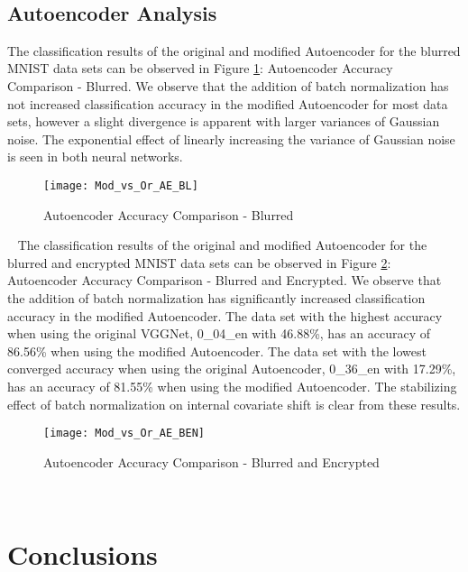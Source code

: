 \documentclass[12pt, titlepage]{article}
\begin{document}
~\newpage
\subsection{Autoencoder Analysis}\label{AEAnalysis}

The classification results of the original and modified Autoencoder for the blurred MNIST data sets can be observed in Figure \ref{GRAPH_COMP_AE_BL}: Autoencoder Accuracy Comparison - Blurred. We observe that the addition of batch normalization has not increased classification accuracy in the modified Autoencoder for most data sets, however a slight divergence is apparent with larger variances of Gaussian noise. The exponential effect of linearly increasing the variance of Gaussian noise is seen in both neural networks.\\

\begin{figure}[h!]
	\begin{center}
		\texttt{[image: Mod\_vs\_Or\_AE\_BL]}
		\caption{Autoencoder Accuracy Comparison - Blurred}
		\label{GRAPH_COMP_AE_BL}
	\end{center}
\end{figure}

~\newpage
\noindent The classification results of the original and modified Autoencoder for the blurred and encrypted MNIST data sets can be observed in Figure \ref{GRAPH_COMP_AE_BEN}: Autoencoder Accuracy Comparison - Blurred and Encrypted. We observe that the addition of batch normalization has significantly increased classification accuracy in the modified Autoencoder. The data set with the highest accuracy when using the original VGGNet, 0\_04\_en with 46.88\%, has an accuracy of 86.56\% when using the modified Autoencoder. The data set with the lowest converged accuracy when using the original Autoencoder, 0\_36\_en with 17.29\%, has an accuracy of 81.55\% when using the modified Autoencoder. The stabilizing effect of batch normalization on internal covariate shift is clear from these results.\\

\begin{figure}[h!]
	\begin{center}
		\texttt{[image: Mod\_vs\_Or\_AE\_BEN]}
		\caption{Autoencoder Accuracy Comparison - Blurred and Encrypted}
		\label{GRAPH_COMP_AE_BEN}
	\end{center}
\end{figure}

~\newpage
\section{Conclusions}\label{Conclusions}
\end{document}
